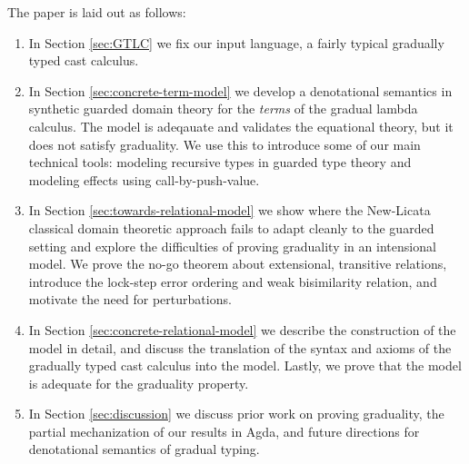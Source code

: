 The paper is laid out as follows:
\begin{enumerate}
\item In Section \ref{sec:GTLC} we fix our input language, a fairly
  typical gradually typed cast calculus.
\item In Section \ref{sec:concrete-term-model} we develop a
  denotational semantics in synthetic guarded domain theory for the
  \emph{terms} of the gradual lambda calculus.  The model is adeqauate
  and validates the equational theory, but it does not satisfy
  graduality. We use this to introduce some of our main technical
  tools: modeling recursive types in guarded type theory and modeling
  effects using call-by-push-value.
\item In Section \ref{sec:towards-relational-model} we show where the New-Licata
  classical domain theoretic approach fails to adapt cleanly to the guarded
  setting and explore the difficulties of proving graduality in an intensional
  model. We prove the no-go theorem about extensional, transitive relations,
  introduce the lock-step error ordering and weak bisimilarity relation, and
  motivate the need for perturbations.
\item In Section \ref{sec:concrete-relational-model} we describe the
  construction of the model in detail, and discuss the
  translation of the syntax and axioms of the gradually typed cast calculus into the model.
  Lastly, we prove that the model is adequate for the graduality property.
\item In Section \ref{sec:discussion} we discuss prior work on proving
  graduality, the partial mechanization of our results in Agda, and
  future directions for denotational semantics of gradual typing.
\end{enumerate}
